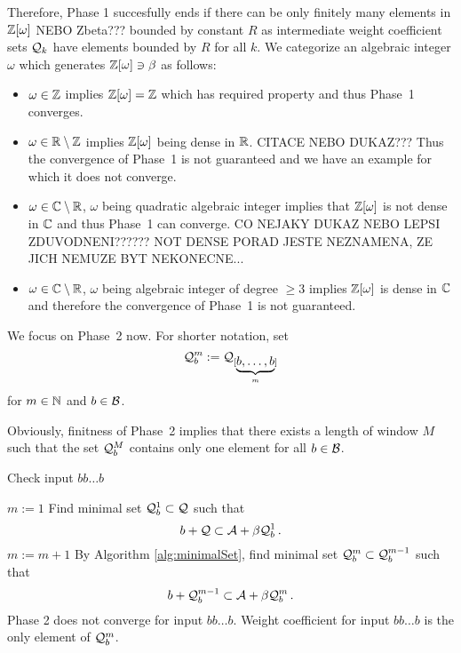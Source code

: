 Therefore, Phase 1 succesfully ends if there can be only finitely many elements in $\mathbb{Z}[\omega]$ NEBO Zbeta??? bounded by constant $R$ as intermediate weight coefficient sets $\mathcal{Q}_k$ have elements bounded by $R$ for all $k$. 
We categorize an algebraic integer $\omega$ which generates $\mathbb{Z}[\omega] \ni \beta$ as follows:
\begin{itemize}
    \item $\omega \in \mathbb{Z}$ implies $\mathbb{Z}[\omega]=\mathbb{Z}$ which has required property and thus Phase~1 converges.
    \item $\omega \in \mathbb{R}\setminus\mathbb{Z}$ implies $\mathbb{Z}[\omega]$ being dense in $\mathbb{R}$. CITACE NEBO DUKAZ??? Thus the convergence of Phase~1 is not guaranteed and we have an example for which it does not converge.
    \item $\omega \in \mathbb{C}\setminus\mathbb{R}$, $\omega$ being quadratic algebraic integer implies that $\mathbb{Z}[\omega]$ is not dense in $\mathbb{C}$ and thus Phase~1 can converge. CO NEJAKY DUKAZ NEBO LEPSI ZDUVODNENI?????? NOT DENSE PORAD JESTE NEZNAMENA, ZE JICH NEMUZE BYT NEKONECNE...
    \item $\omega \in \mathbb{C}\setminus\mathbb{R}$, $\omega$ being algebraic integer of degree $\geq 3$ implies $\mathbb{Z}[\omega]$ is  dense in $\mathbb{C}$ and therefore the convergence of Phase~1 is not guaranteed.
\end{itemize}

We focus on Phase~2 now. For shorter notation, set 
$$
\mathcal{Q}^m_b:=\mathcal{Q}_{[\underbrace{b,\dots,b}_m]}
$$ for $m \in \mathbb{N}$ and $b\in\mathcal{B}$.

Obviously, finitness of Phase~2 implies that there exists a length of window $M$ such that the set $\mathcal{Q}^M_b$ contains only one element for all $b\in\mathcal{B}$. 

\begin{algorithm}
  \caption{Check input $bb\dots b$}
    \label{alg:oneletterSets}
  \begin{algorithmic}[1]
    \STATE $m:=1$
    \STATE Find minimal set $\mathcal{Q}^1_b \subset \mathcal{Q}$ such that
      $$
      b + \mathcal{Q} \subset \mathcal{A} + \beta \mathcal{Q}^1_b\,.
      $$
      \vspace{-20pt}
        \STATE $m:= m +1$
        \STATE By Algorithm \ref{alg:minimalSet}, find minimal set $\mathcal{Q}^m_b \subset \mathcal{Q}^{m-1}_b$ such that
          $$
          b + \mathcal{Q}^{m-1}_b \subset \mathcal{A} + \beta \mathcal{Q}^m_b\,.
          $$  
          \vspace{-20pt}
            \RETURN Phase 2 does not converge for input $bb\dots b$.
        \ENDIF
    \ENDWHILE  
    \RETURN Weight coefficient for input $bb\dots b$ is the only element of $\mathcal{Q}^m_b$.
  \end{algorithmic}
\end{algorithm}

